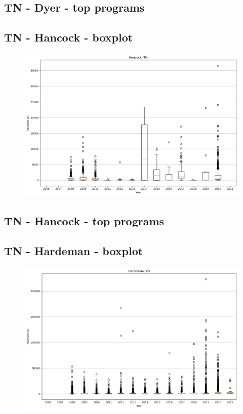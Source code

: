 \subsection*{TN - Dyer - top programs}

\newpage
\subsection*{TN - Hancock - boxplot}
\begin{figure}[h]
\centering
\includegraphics[width=7in]{../output/boxplots/counties/Hancock-TN_boxplot.png}
\end{figure}


\subsection*{TN - Hancock - top programs}

\newpage
\subsection*{TN - Hardeman - boxplot}
\begin{figure}[h]
\centering
\includegraphics[width=7in]{../output/boxplots/counties/Hardeman-TN_boxplot.png}
\end{figure}


